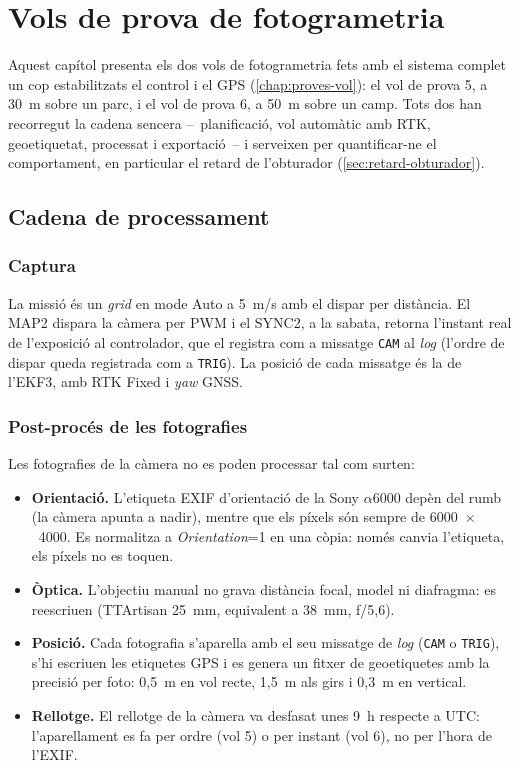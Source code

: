 \chapter{Vols de prova de fotogrametria}
\label{chap:vols-prova}

Aquest capítol presenta els dos vols de fotogrametria fets amb el sistema complet un cop estabilitzats el control i el GPS (\cref{chap:proves-vol}): el vol de prova 5, a 30~m sobre un parc, i el vol de prova 6, a 50~m sobre un camp. Tots dos han recorregut la cadena sencera --~planificació, vol automàtic amb RTK, geoetiquetat, processat i exportació~-- i serveixen per quantificar-ne el comportament, en particular el retard de l'obturador (\cref{sec:retard-obturador}).

\section{Cadena de processament}
\label{sec:cadena-processat}

\subsection{Captura}

La missió és un \emph{grid} en mode Auto a 5~m/s amb el dispar per distància. El MAP2 dispara la càmera per PWM i el SYNC2, a la sabata, retorna l'instant real de l'exposició al controlador, que el registra com a missatge \texttt{CAM} al \emph{log} (l'ordre de dispar queda registrada com a \texttt{TRIG}). La posició de cada missatge és la de l'EKF3, amb RTK Fixed i \emph{yaw} GNSS.

\subsection{Post-procés de les fotografies}
\label{sec:processament-fotos}

Les fotografies de la càmera no es poden processar tal com surten:
\begin{itemize}
    \item \textbf{Orientació.} L'etiqueta EXIF d'orientació de la Sony $\alpha$6000 depèn del rumb (la càmera apunta a nadir), mentre que els píxels són sempre de 6000~$\times$~4000. Es normalitza a \emph{Orientation}=1 en una còpia: només canvia l'etiqueta, els píxels no es toquen.
    \item \textbf{Òptica.} L'objectiu manual no grava distància focal, model ni diafragma: es reescriuen (TTArtisan 25~mm, equivalent a 38~mm, f/5,6).
    \item \textbf{Posició.} Cada fotografia s'aparella amb el seu missatge de \emph{log} (\texttt{CAM} o \texttt{TRIG}), s'hi escriuen les etiquetes GPS i es genera un fitxer de geoetiquetes amb la precisió per foto: 0,5~m en vol recte, 1,5~m als girs i 0,3~m en vertical.
    \item \textbf{Rellotge.} El rellotge de la càmera va desfasat unes 9~h respecte a UTC: l'aparellament es fa per ordre (vol 5) o per instant (vol 6), no per l'hora de l'EXIF.
\end{itemize}

